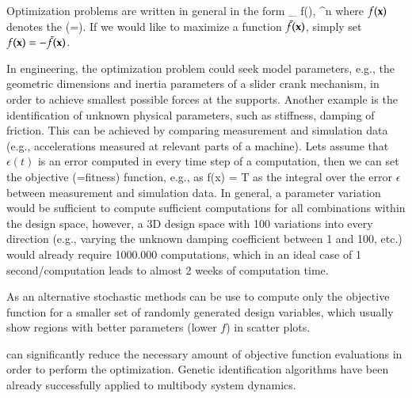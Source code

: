 Optimization problems are written in general in the form
\be
  \min\limits_{\xv} f(\xv), \quad \xv \in \Rcal^n \eqComma
\ee
where $f(\mathbf{x})$ denotes the  (=). If we would like to maximize a function $\bar f(\mathbf{x})$, simply set $f(\mathbf{x})=-\bar f(\mathbf{x})$.

In engineering, the optimization problem could seek model parameters, e.g., the geometric dimensions and inertia parameters of a slider crank mechanism, in order to achieve smallest possible forces at the supports.
Another example is the identification of unknown physical parameters, such as stiffness, damping of friction. This can be achieved by comparing measurement and simulation data (e.g., accelerations measured at relevant parts of a machine). Lets assume that $\epsilon(t)$ is an error computed in every time step of a computation, then we can set the objective (=fitness) function, e.g., as 
\be
  f(x) =  T 
\ee
as the integral over the error $\epsilon$ between measurement and simulation data.
In general, a parameter variation would be sufficient to compute sufficient computations for all combinations within the design space, however, a 3D design space with 100 variations into every direction (e.g., varying the unknown damping coefficient between 1 and 100, etc.) would already require 1000.000 computations, which in an ideal case of 1 second/computation leads to almost 2 weeks of computation time.

As an alternative stochastic methods can be use to compute only the objective function for a smaller set of randomly generated design variables, which usually show regions with better parameters (lower $f$) in scatter plots.

\cite{Goldberg1989, Whitley1994} can significantly reduce the necessary amount of objective function evaluations in order to perform the optimization. Genetic identification algorithms have been already successfully applied to multibody system dynamics\cite{Eder2014}. 

